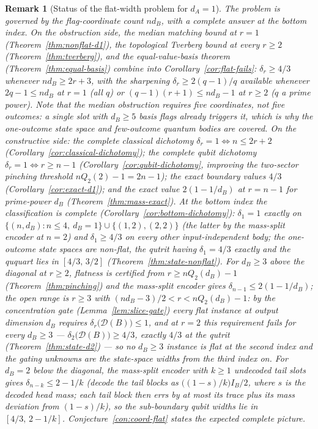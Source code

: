 \documentclass[11pt,a4paper]{article}
\newtheorem{remark}[theorem]{Remark}
\begin{document}
\begin{remark}[Status of the flat-width problem for $d_A=1$]
\label{rem:flat-status}
The problem is governed by the flag-coordinate count $nd_B$, with a complete answer
at the bottom index. On the obstruction side,
the median matching bound at $r=1$ (Theorem~\ref{thm:nonflat-d1}), the topological
Tverberg bound at every $r\ge2$ (Theorem~\ref{thm:tverberg}), and the
equal-value-basis theorem (Theorem~\ref{thm:equal-basis}) combine into
Corollary~\ref{cor:flat-fails}: $\delta_r\ge4/3$ whenever $nd_B\ge2r+3$, with the
sharpening $\delta_r\ge2(q-1)/q$ available whenever $2q-1\le nd_B$ at $r=1$ (all $q$)
or $(q-1)(r+1)\le nd_B-1$ at $r\ge2$ ($q$ a prime power). Note that the median
obstruction requires five \emph{coordinates}, not five outcomes: a single slot with
$d_B\ge5$ basis flags already triggers it, which is why the one-outcome state space
and few-outcome quantum bodies are covered. On the constructive side:
the complete classical dichotomy $\delta_r=1\iff n\le2r+2$
(Corollary~\ref{cor:classical-dichotomy}); the complete qubit dichotomy
$\delta_r=1\iff r\ge n-1$ (Corollary~\ref{cor:qubit-dichotomy}, improving the
two-sector pinching threshold $nQ_2(2)-1=2n-1$); the exact boundary values $4/3$ (Corollary~\ref{cor:exact-d1}); and the exact
value $2(1-1/d_B)$ at $r=n-1$ for prime-power $d_B$ (Theorem~\ref{thm:mass-exact}).
At the bottom index the classification is complete
(Corollary~\ref{cor:bottom-dichotomy}): $\delta_1=1$ exactly on
$\{(n,d_B):n\le4,\ d_B=1\}\cup\{(1,2),(2,2)\}$ (the latter by the mass-split encoder
at $n=2$) and $\delta_1\ge4/3$ on every other input-independent body; the one-outcome
state spaces are non-flat, the qutrit having $\delta_1=4/3$ exactly and the ququart lies in
$[4/3,\,3/2]$ (Theorem~\ref{thm:state-nonflat}). For $d_B\ge3$ above the diagonal at
$r\ge2$, flatness is certified from
$r\ge nQ_2(d_B)-1$ (Theorem~\ref{thm:pinching}) and the mass-split encoder gives
$\delta_{n-1}\le2(1-1/d_B)$; the open range is $r\ge3$ with $(nd_B-3)/2<r<nQ_2(d_B)-1$: by the concentration gate (Lemma~\ref{lem:slice-gate}) every flat instance at output dimension $d_B$ requires $\delta_r\bigl(\mathcal D(B)\bigr)\le1$, and at $r=2$ this requirement fails for every $d_B\ge3$ --- $\delta_2\bigl(\mathcal D(B)\bigr)\ge4/3$, exactly $4/3$ at the qutrit (Theorem~\ref{thm:state-d2}) --- so no $d_B\ge3$ instance is flat at the second index and the gating unknowns are the state-space widths from the third index on. For $d_B=2$
below the diagonal, the mass-split encoder with $k\ge1$ undecoded tail slots gives
$\delta_{n-k}\le2-1/k$ (decode the tail blocks as $\big((1-s)/k\big)I_B/2$, where $s$
is the decoded head mass; each tail block then errs by at most its trace plus its mass
deviation from $(1-s)/k$), so the sub-boundary qubit widths lie in $[4/3,\,2-1/k]$.
Conjecture~\ref{con:coord-flat} states the expected complete
picture.
\end{remark}
\end{document}
